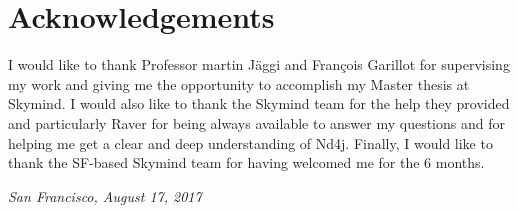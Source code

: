 \chapter*{Acknowledgements}

I would like to thank Professor martin Jäggi and François Garillot for supervising my work and giving me the opportunity to accomplish my Master thesis at Skymind. I would also like to thank the Skymind team for the help they provided and particularly Raver for being always available to answer my questions and for helping me get a clear and deep understanding of Nd4j. 
Finally, I would like to thank the SF-based Skymind team for having welcomed me for the 6 months.



\bigskip
 
\noindent\textit{San Francisco, August 17, 2017}
